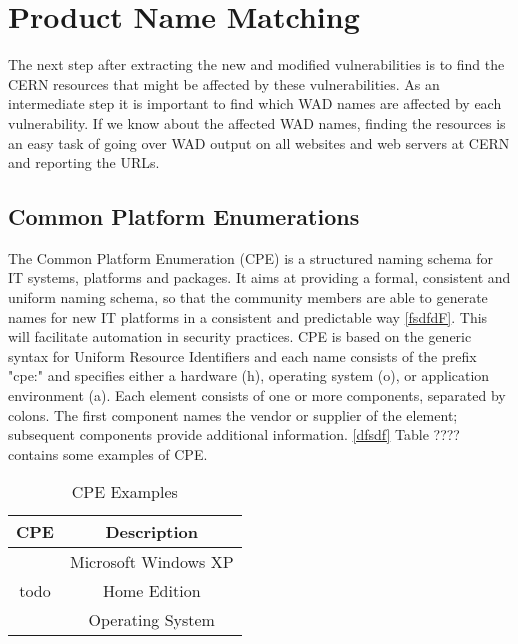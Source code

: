 \section{Product Name Matching}

The next step after extracting the new and modified vulnerabilities is to find the CERN resources that might be affected by these vulnerabilities. As an intermediate step it is important to find which WAD names are affected by each vulnerability. If we know about the affected WAD names, finding the resources is an easy task of going over WAD output on all websites and web servers at CERN and reporting the URLs. 
\subsection{Common Platform Enumerations}
The Common Platform Enumeration (CPE) is a structured naming schema for IT systems, platforms and packages. It aims at providing a formal, consistent and uniform naming schema, so that the community members are able to generate names for new IT platforms in a consistent and predictable way \ref{fsdfdF}. This will facilitate automation in security practices. CPE is based on the generic syntax for Uniform Resource Identifiers and each name consists of the prefix "cpe:" and specifies either a hardware (h), operating system (o), or application environment (a). Each element consists of one or more components, separated by colons. The first component names the vendor or supplier of the element; subsequent components provide additional information. \ref{dfsdf} 
Table ???? contains some examples of CPE. 

\begin{table}
\begin{center}
    \begin{tabular}{ | c | c | }
    
    \hline
	 
    CPE & Description  
    \\ \hline
   \multirow{3}{*}{todo} & Microsoft Windows XP \\ & Home Edition \\ & Operating System
        \\ \hline
    \end{tabular}
    \caption{CPE Examples}
    \label{table:sample_cpes}
   \end{center}
    
\end{table}







